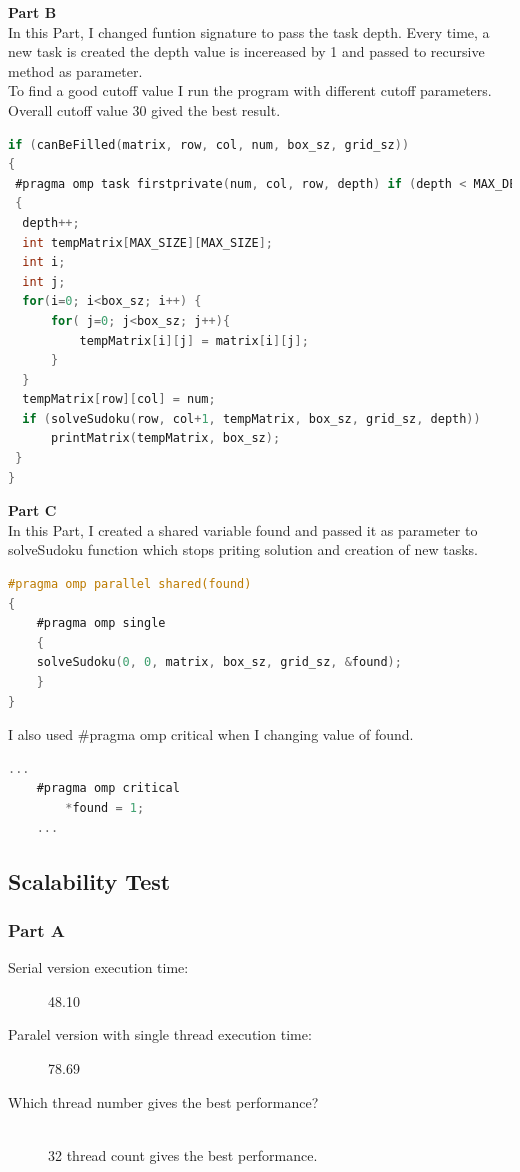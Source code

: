\documentclass{article}
\newcommand\tab[1][0.5cm]{\hspace*{#1}}
\begin{document}
\textbf{Part B}
\\ \tab In this Part, I changed funtion signature to pass the task depth. Every time, a new task is created 
the depth value is incereased by 1 and passed to recursive method as parameter.
\\ \tab To find a good cutoff value I run the program with different cutoff parameters. Overall cutoff value 30 gived the best result.
\begin{lstlisting}[language=C]
if (canBeFilled(matrix, row, col, num, box_sz, grid_sz)) 
{  
 #pragma omp task firstprivate(num, col, row, depth) if (depth < MAX_DEPTH)
 {
  depth++;
  int tempMatrix[MAX_SIZE][MAX_SIZE];
  int i;
  int j;
  for(i=0; i<box_sz; i++) {
      for( j=0; j<box_sz; j++){
          tempMatrix[i][j] = matrix[i][j];
      }
  }
  tempMatrix[row][col] = num; 				
  if (solveSudoku(row, col+1, tempMatrix, box_sz, grid_sz, depth)) 
      printMatrix(tempMatrix, box_sz);
 }					
}
\end{lstlisting}

\textbf{Part C}
\\ \tab In this Part, I created a shared variable found and passed it as 
parameter to solveSudoku function which stops priting solution and creation of new tasks.  
\begin{lstlisting}[language=C]
#pragma omp parallel shared(found)
{
	#pragma omp single 
	{
	solveSudoku(0, 0, matrix, box_sz, grid_sz, &found);
	}
}
\end{lstlisting}
I also used \#pragma omp critical when I changing value of found.
\begin{lstlisting}[language=C]
    ...
    #pragma omp critical
        *found = 1; 
    ...
\end{lstlisting}
\newpage

\subsection{Scalability Test}
\subsubsection{Part A}
\begin{description}
\item[Serial version execution time: ] 48.10
\item[Paralel version with single thread execution time: ] 78.69
\item[Which thread number gives the best performance?]\hfill \\
32 thread count gives the best performance.
\end{description} 
\end{document}
